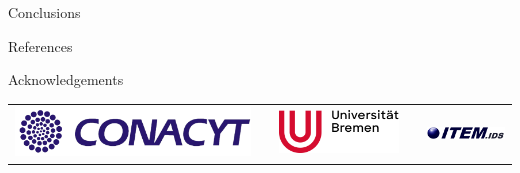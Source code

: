 \documentclass[final]{beamer}
\newlength{\onecolwid}
\begin{document}
\begin{frame}[t]
\begin{columns}[t]
\begin{column}{\onecolwid}
\begin{block}{Conclusions}
\end{block}


\begin{block}{References}

\nocite{*} %
\small{
\vspace{0.75in}}

\end{block}



\begin{block}{Acknowledgements}
\begin{center}
	\small{}
\end{center}
\end{block}

\begin{center}
	\begin{tabular}{lcccr}
		\includegraphics[width=0.30\linewidth]{../figures/logo_CONACYT.png} & &
		\includegraphics[width=0.20\linewidth]{../figures/logo_ub_2021.png} & & \includegraphics[width=0.25\linewidth]{../figures/logo_item_ids.png}
	\end{tabular}
\end{center}

\end{column} %

\end{columns} %

\end{frame} %
\end{document}
